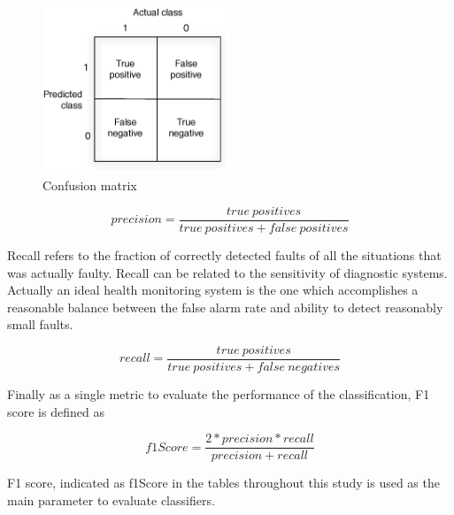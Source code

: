 \begin{figure}
\begin{center}
\includegraphics[width=0.5\textwidth]{figures/confusionMatrix}    %
\caption{Confusion matrix} 
\label{fig:confusionMatrix}
\end{center}
\end{figure}


\begin{equation}
precision = \frac{true \ positives}{true \ positives + false \ positives}
\end{equation}

Recall refers to the fraction of correctly detected faults of all the situations that was actually faulty. 
Recall can be related to the sensitivity of diagnostic systems. 
Actually an ideal health monitoring system is the one which accomplishes a reasonable balance between the false alarm rate and ability to detect reasonably small faults. 

\begin{equation}
recall = \frac{true \ positives}{true \ positives + false \ negatives}
\end{equation}

Finally as a single metric to evaluate the performance of the classification, F1 score is defined as

\begin{equation}
f1Score = \frac{2 * precision * recall}{precision + recall}
\end{equation}

F1 score, indicated as f1Score in the tables throughout this study is used as the main parameter to evaluate classifiers.

